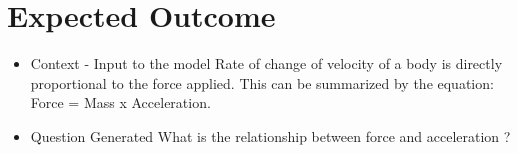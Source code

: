 \documentclass[
11pt,notheorems,hyperref={pdfauthor=whatever}
]{beamer}
\begin{document}
\begin{Large}
\begin{frame}
\end{frame}

 
\section{Expected Outcome}
\begin{frame}
\begin{itemize}
    

    \item Context - Input to the model
        \newline
        Rate of change of velocity of a body is directly proportional to the force applied. This can be summarized by the equation: Force = Mass x Acceleration. 

    \item Question Generated 
        \newline
        What is the relationship between force and acceleration ?
  		 
\end{itemize}
			
\end{frame}




    


\end{Large}
\end{document}
